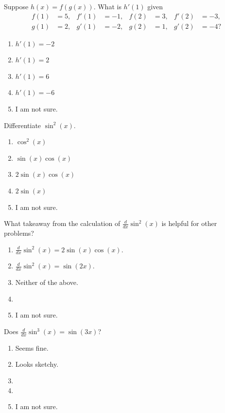 \documentclass[aspectratio=169, 14pt, t]{beamer}  %
\begin{document}
\begin{poll}
  Suppose \(h(x) = f(g(x))\). What is \(h'(1)\) given
  \begin{align*}
    f(1) &= 5,& f'(1) &= -1, &f(2) &= 3, & f'(2) &= -3, \\
    g(1) &= 2,& g'(1) &= -2, &g(2) &= 1, & g'(2) &= -4?
  \end{align*}

  \begin{enumerate}
    \item \(h'(1) = -2\)
    \item \(h'(1) = 2\)
    \item \(h'(1) = 6\)
    \item \(h'(1) = -6\)
    \item I am not sure.
  \end{enumerate}
\end{poll}

\begin{poll}
  Differentiate \(\sin^{2}(x)\).

  \begin{enumerate}
    \item \(\cos^{2}(x)\)
    \item \(\sin(x)\cos(x)\)
    \item \(2\sin(x)\cos(x)\) 
    \item \(2\sin(x)\)
    \item I am not sure.
  \end{enumerate}
\end{poll}

\begin{poll}
  What takeaway from the calculation of \(\frac{d}{dx} \sin^{2}(x)\) is helpful for other problems?

  \begin{enumerate}
    \item \(\frac{d}{dx} \sin^{2}(x) = 2 \sin(x) \cos(x)\).
    \item \(\frac{d}{dx} \sin^{2}(x) = \sin(2x)\).  
    \item Neither of the above. 
    \item
    \item I am not sure.
  \end{enumerate}
\end{poll}

\begin{poll}
  Does \(\frac{d}{dx} \sin^{3}(x) = \sin(3x)\)?

  \begin{enumerate}
    \item Seems fine.
    \item Looks sketchy.
    \item
    \item
    \item I am not sure.
  \end{enumerate}
\end{poll}
\end{document}
